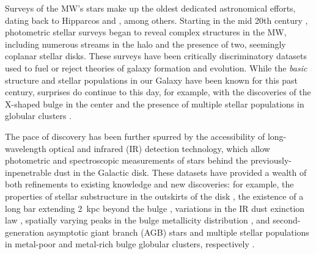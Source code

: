 \documentclass[12pt,twocolumn]{emulateapj}
\begin{document}
Surveys of the MW's stars make up the oldest dedicated astronomical efforts, dating back to Hipparcos and \citet{Herschel_1785_Oheavens}, among others.  Starting in the mid 20th century \citep[shortly after it was proven that the MW {\it was} a galaxy\footnote{We note that numerous earlier astronomers, including Nas\={\i}r al-D\={\i}n T\={u}s\={\i} and Immanuel Kant, speculated that the Galaxy was a distinct body composed of clustered stars, but technology did not enable the scientific proof of these conjectures until the late 19th and early 20th centuries.}; e.g.,][]{Curtis_1917_islanduniverses,Hubble_1926_extragalacticnebulae}, photometric stellar surveys began to reveal complex structures in the MW, including numerous streams in the halo and the presence of two, seemingly coplanar stellar disks.  These surveys have been critically discriminatory datasets used to fuel or reject theories of galaxy formation and evolution.  While the {\it basic} structure and stellar populations in our Galaxy have been known for this past century, surprises do continue to this day, for example, with the discoveries of the X-shaped bulge in the center \citep{McWilliam_10_xshapedbulge,Nataf_2010_dualbulgeRC,Ness_2016_Xshapedbulge} and the presence of multiple stellar populations in globular clusters \citep[e.g.,][]{Piotto_2009_GCmultiplepops,Gratton_2012_multipleGCpops}.  

The pace of discovery has been further spurred by the accessibility of long-wavelength optical and infrared (IR) detection technology, which allow photometric and spectroscopic measurements of stars behind the previously-inpenetrable dust in the Galactic disk.  These datasets have provided a wealth of both refinements to existing knowledge and new discoveries: for example, 
the properties of stellar substructure in the outskirts of the disk \citep[with 2MASS;][]{Rocha-Pinto_2003_GASS},
the existence of a long bar extending 2~kpc beyond the bulge \citep[with GLIMPSE;][]{Benjamin_05_glimpse}, 
variations in the IR dust exinction law \citep[with 2MASS and GLIMPSE;][]{Nishi_09_extlaw,Zasowski_09_extlaw}, 
spatially varying peaks in the bulge metallicity distribution \citep[with ARGOS;][]{Ness_2013_argos}, 
and second-generation asymptotic giant branch (AGB) stars and multiple stellar populations in metal-poor and metal-rich bulge
globular clusters, respectively \citep[with APOGEE;][]{GarciaHernandez_2ndGenAGB,Schiavon_2017_APOGEEbulgeGCs}.  
\end{document}

